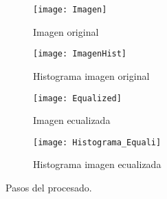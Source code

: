 \begin{figure}

	\begin{subfigure}[c]{.5\linewidth}
	\centering\large \texttt{[image: Imagen]}
	\caption{Imagen original}
	\end{subfigure}%
	\begin{subfigure}[c]{.5\linewidth}
	\centering\large \texttt{[image: ImagenHist]}
	\caption{Histograma imagen original}
	\end{subfigure}%

	\begin{subfigure}[c]{.5\linewidth}
	\centering\large \texttt{[image: Equalized]}
	\caption{Imagen ecualizada}
	\end{subfigure}%
	\begin{subfigure}[c]{.5\linewidth}
	\centering\large \texttt{[image: Histograma\_Equali]}
	\caption{Histograma imagen ecualizada}
	\end{subfigure}%

\caption{Pasos del procesado.}\label{fig:2.1}
\end{figure}

